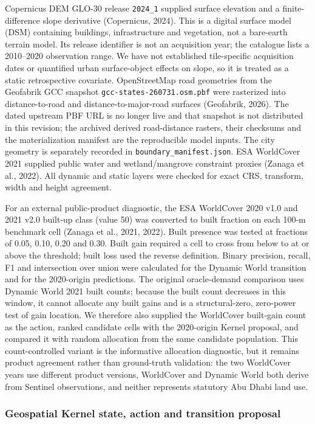 Copernicus DEM GLO-30 release \texttt{2024\_1} supplied surface
elevation and a finite-difference slope derivative (Copernicus, 2024).
This is a digital surface model (DSM) containing buildings,
infrastructure and vegetation, not a bare-earth terrain model. Its
release identifier is not an acquisition year; the catalogue lists a
2010--2020 observation range. We have not established tile-specific
acquisition dates or quantified urban surface-object effects on slope,
so it is treated as a static retrospective covariate. OpenStreetMap road
geometries from the Geofabrik GCC snapshot
\texttt{gcc-states-260731.osm.pbf} were rasterized into distance-to-road
and distance-to-major-road surfaces (Geofabrik, 2026). The dated
upstream PBF URL is no longer live and that snapshot is not distributed
in this revision; the archived derived road-distance rasters, their
checksums and the materialization manifest are the reproducible model
inputs. The city geometry is separately recorded in
\texttt{boundary\_manifest.json}. ESA WorldCover 2021 supplied public
water and wetland/mangrove constraint proxies (Zanaga et al., 2022). All
dynamic and static layers were checked for exact CRS, transform, width
and height agreement.

For an external public-product diagnostic, the ESA WorldCover 2020 v1.0
and 2021 v2.0 built-up class (value 50) was converted to built fraction
on each 100-m benchmark cell (Zanaga et al., 2021, 2022). Built presence
was tested at fractions of 0.05, 0.10, 0.20 and 0.30. Built gain
required a cell to cross from below to at or above the threshold; built
loss used the reverse definition. Binary precision, recall, F1 and
intersection over union were calculated for the Dynamic World transition
and for the 2020-origin predictions. The original oracle-demand
comparison uses Dynamic World 2021 built counts; because the built count
decreases in this window, it cannot allocate any built gains and is a
structural-zero, zero-power test of gain location. We therefore also
supplied the WorldCover built-gain count as the action, ranked candidate
cells with the 2020-origin Kernel proposal, and compared it with random
allocation from the same candidate population. This count-controlled
variant is the informative allocation diagnostic, but it remains product
agreement rather than ground-truth validation: the two WorldCover years
use different product versions, WorldCover and Dynamic World both derive
from Sentinel observations, and neither represents statutory Abu Dhabi
land use.

\subsubsection{Geospatial Kernel state, action and transition
proposal}\label{geospatial-kernel-state-action-and-transition-proposal}

